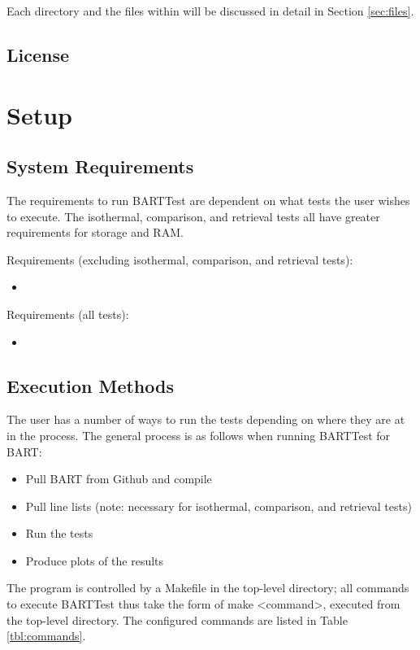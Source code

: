 \documentclass[letterpaper, 12pt]{article}
\begin{document}
Each directory and the files within will be discussed in detail in 
Section \ref{sec:files}.

\pagebreak
\subsection{License}
\label{sec:license}

\section{Setup}
\label{sec:setup}

\subsection{System Requirements}
The requirements to run BARTTest are dependent on what tests the user wishes to 
execute. The isothermal, comparison, and retrieval tests all have greater 
requirements for storage and RAM.

Requirements (excluding isothermal, comparison, and retrieval tests):
\begin{itemize} \itemsep0pt
  \item 
\end{itemize}

Requirements (all tests):
\begin{itemize} \itemsep0pt
  \item 
\end{itemize}

\subsection{Execution Methods}
\label{sec:commands}
The user has a number of ways to run the tests depending on where they are at 
in the process. The general process is as follows when running BARTTest for 
BART:
\begin{itemize} \itemsep0pt
  \item Pull BART from Github and compile
  \item Pull line lists (note: necessary for 
        isothermal, comparison, and retrieval tests)
  \item Run the tests
  \item Produce plots of the results
\end{itemize}

The program is controlled by a Makefile in the top-level directory; all 
commands to execute BARTTest thus take the form of 
make {\textless}command{\textgreater}, executed 
from the top-level directory. The configured commands are listed in 
Table \ref{tbl:commands}.
\end{document}
